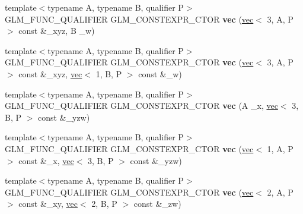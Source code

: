 \begin{DoxyCompactItemize}
{\footnotesize template$<$typename A, typename B, qualifier P$>$ }\\G\+L\+M\+\_\+\+F\+U\+N\+C\+\_\+\+Q\+U\+A\+L\+I\+F\+I\+ER G\+L\+M\+\_\+\+C\+O\+N\+S\+T\+E\+X\+P\+R\+\_\+\+C\+T\+OR {\bfseries vec} (\hyperlink{structglm_1_1vec}{vec}$<$ 3, A, P $>$ const \&\+\_\+xyz, B \+\_\+w)
\item 
\mbox{\label{structglm_1_1vec_3_014_00_01T_00_01Q_01_4_a27077d4fe09d53d6068b43e31e264eb6}} 
{\footnotesize template$<$typename A, typename B, qualifier P$>$ }\\G\+L\+M\+\_\+\+F\+U\+N\+C\+\_\+\+Q\+U\+A\+L\+I\+F\+I\+ER G\+L\+M\+\_\+\+C\+O\+N\+S\+T\+E\+X\+P\+R\+\_\+\+C\+T\+OR {\bfseries vec} (\hyperlink{structglm_1_1vec}{vec}$<$ 3, A, P $>$ const \&\+\_\+xyz, \hyperlink{structglm_1_1vec}{vec}$<$ 1, B, P $>$ const \&\+\_\+w)
\item 
\mbox{\label{structglm_1_1vec_3_014_00_01T_00_01Q_01_4_a0f2076b0eb558352f0d57e058e3e9c70}} 
{\footnotesize template$<$typename A, typename B, qualifier P$>$ }\\G\+L\+M\+\_\+\+F\+U\+N\+C\+\_\+\+Q\+U\+A\+L\+I\+F\+I\+ER G\+L\+M\+\_\+\+C\+O\+N\+S\+T\+E\+X\+P\+R\+\_\+\+C\+T\+OR {\bfseries vec} (A \+\_\+x, \hyperlink{structglm_1_1vec}{vec}$<$ 3, B, P $>$ const \&\+\_\+yzw)
\item 
\mbox{\label{structglm_1_1vec_3_014_00_01T_00_01Q_01_4_a25424f78a9e0345486eeaafbcd1c8a7e}} 
{\footnotesize template$<$typename A, typename B, qualifier P$>$ }\\G\+L\+M\+\_\+\+F\+U\+N\+C\+\_\+\+Q\+U\+A\+L\+I\+F\+I\+ER G\+L\+M\+\_\+\+C\+O\+N\+S\+T\+E\+X\+P\+R\+\_\+\+C\+T\+OR {\bfseries vec} (\hyperlink{structglm_1_1vec}{vec}$<$ 1, A, P $>$ const \&\+\_\+x, \hyperlink{structglm_1_1vec}{vec}$<$ 3, B, P $>$ const \&\+\_\+yzw)
\item 
\mbox{\label{structglm_1_1vec_3_014_00_01T_00_01Q_01_4_a6273e714a533a4354356ad4a130bf535}} 
{\footnotesize template$<$typename A, typename B, qualifier P$>$ }\\G\+L\+M\+\_\+\+F\+U\+N\+C\+\_\+\+Q\+U\+A\+L\+I\+F\+I\+ER G\+L\+M\+\_\+\+C\+O\+N\+S\+T\+E\+X\+P\+R\+\_\+\+C\+T\+OR {\bfseries vec} (\hyperlink{structglm_1_1vec}{vec}$<$ 2, A, P $>$ const \&\+\_\+xy, \hyperlink{structglm_1_1vec}{vec}$<$ 2, B, P $>$ const \&\+\_\+zw)

\end{DoxyCompactItemize}
